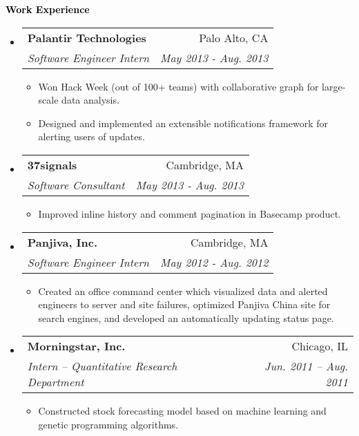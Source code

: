 \documentclass[letterpaper,11pt]{article}
\makeatletter
\newcommand{\resitem}[1]{\item #1 \vspace{-2pt}}
\newcommand{\resheading}[1]{{\large \colorbox{mygrey}{\begin{minipage}{\textwidth}{\textbf{ \textcolor{Black}{#1 \vphantom{p\^{E}}}}}\end{minipage}}}}
\newcommand{\ressubheading}[4]{
\begin{tabular*}{6.5in}{l@{\extracolsep{\fill}}r}
		\textbf{#1} & #2 \\
		\textit{#3} & \textit{#4} \\
\end{tabular*}\vspace{-6pt}}
\makeatother
\begin{document}
\resheading{Work Experience}
	\begin{itemize}
		\item
			\ressubheading{Palantir Technologies}{Palo Alto, CA}{Software Engineer Intern}{May 2013 - Aug. 2013}
			{ \footnotesize
			\begin{itemize}
				\resitem{Won Hack Week (out of 100+ teams) with collaborative graph for large-scale data analysis.}
				\resitem{Designed and implemented an extensible notifications framework for alerting users of updates.}
			\end{itemize}
			} 	
		\item
			\ressubheading{37signals}{Cambridge, MA}{Software Consultant}{May 2013 - Aug. 2013}
			{ \footnotesize
			\begin{itemize}
				\resitem{Improved inline history and comment pagination in Basecamp product.}
			\end{itemize}
			} 	

		\item
			\ressubheading{Panjiva, Inc.}{Cambridge, MA}{Software Engineer Intern}{May 2012 - Aug. 2012}
			{ \footnotesize
			\begin{itemize}
				\resitem{Created an office command center which visualized data and alerted engineers to server and site failures, optimized Panjiva China site for search engines, and developed an automatically updating status page.}

			\end{itemize}
			} 

		\item
			\ressubheading{Morningstar, Inc.}{Chicago, IL}{Intern -- Quantitative Research Department}
{Jun. 2011 -- Aug. 2011}
				{ \footnotesize
				\begin{itemize}
					\resitem{Constructed stock forecasting model based on machine learning and genetic programming algorithms.}
				\end{itemize}
				}


\end{itemize}
\end{document}
